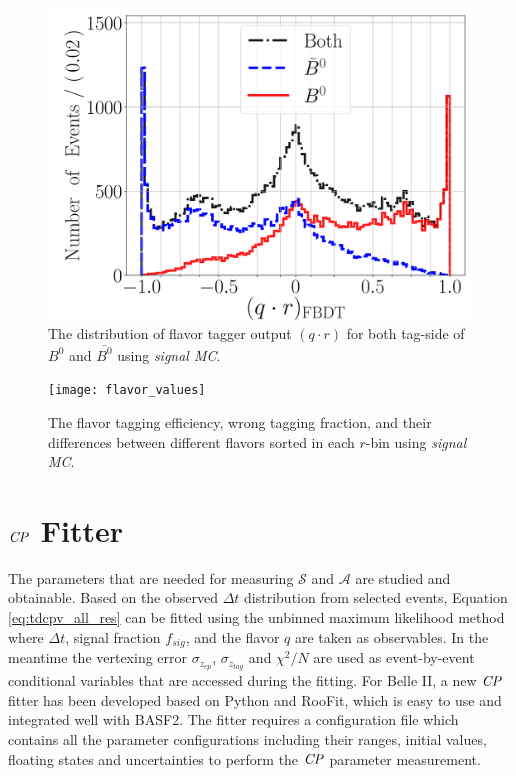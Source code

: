  \begin{figure}[htpb]
 	\centering
 	\includegraphics[width=0.7\linewidth]{figures/qr}
 	\caption{The distribution of flavor tagger output $(q\cdot r)$ for both tag-side of $B^0$ and $\bar{B^0}$ using \textit{signal MC}.}
 	\label{fig:ft_qr}
 	\end{figure}
 \begin{figure}[htpb]
 	\texttt{[image: flavor\_values]}
 	\caption{The flavor tagging efficiency, wrong tagging fraction, and their differences between different flavors sorted in each $r$-bin using \textit{signal MC}.}
 	\label{fig:ft_wtag}
 \end{figure}

\section{$\it{CP}$ Fitter}

The parameters that are needed for measuring $\mathcal{S}$ and $\mathcal{A}$ are studied and obtainable. Based on the observed $\Delta t$ distribution from selected events, Equation \ref{eq:tdcpv_all_res} can be fitted using the unbinned maximum likelihood method where $\Delta t$, signal fraction $f_{sig}$, and the flavor $q$ are taken as observables. In the meantime the vertexing error $\sigma_{z_{cp}}$, $\sigma_{z_{tag}}$ and $\chi^2/N$ are used as event-by-event conditional variables that are accessed during the fitting.
For Belle II, a new $\it{CP}$ fitter has been developed based on Python and RooFit, which is easy to use and integrated well with BASF2. The fitter requires a configuration file which contains all the parameter configurations including their ranges, initial values, floating states and uncertainties to perform the $\it{CP}$ parameter measurement. 

